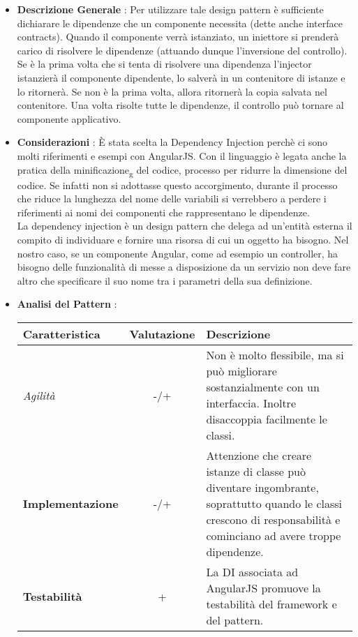 {{{			\begin{itemize}\itemsep1pt
				\item \textbf{Descrizione Generale} : Per utilizzare tale design pattern è sufficiente dichiarare le dipendenze che un componente necessita (dette anche interface contracts). Quando il componente verrà istanziato, un iniettore si prenderà carico di risolvere le dipendenze (attuando dunque l'inversione del controllo). Se è la prima volta che si tenta di risolvere una dipendenza l'injector istanzierà il componente dipendente, lo salverà in un contenitore di istanze e lo ritornerà. Se non è la prima volta, allora ritornerà la copia salvata nel contenitore. Una volta risolte tutte le dipendenze, il controllo può tornare al componente applicativo.
				\item \textbf{Considerazioni} : È stata scelta la Dependency Injection perchè ci sono molti riferimenti e esempi con AngularJS. Con il linguaggio è legata anche la pratica della minificazione\textsubscript{g} del codice, processo per ridurre la dimensione del codice. Se infatti non si adottasse questo accorgimento, durante il processo che riduce la lunghezza del nome delle variabili si verrebbero a perdere i riferimenti ai nomi dei componenti che rappresentano le dipendenze.\\
				La dependency injection è un design pattern che delega ad un’entità esterna il compito di individuare e fornire una risorsa di cui un oggetto ha bisogno. Nel nostro caso, se un componente Angular, come ad esempio un controller, ha bisogno delle funzionalità di messe a disposizione da un servizio non deve fare altro che specificare il suo nome tra i parametri della sua definizione.
				\item \textbf{Analisi del Pattern} :
				\small %
				{\renewcommand\arraystretch{1.2} %
					\begin{tabular}{|l|c|l|}
						\hline
						{\textbf{Caratteristica}}&{\textbf{Valutazione}}&{\textbf{Descrizione}}\\
						\hline
						\textit{Agilità} & -/+ & Non è molto flessibile, ma si può migliorare sostanzialmente con un interfaccia. Inoltre disaccoppia facilmente le classi. \\
						\hline
						\textbf{Implementazione} & -/+ & Attenzione che creare istanze di classe può diventare ingombrante, soprattutto quando le classi crescono di responsabilità e cominciano ad avere troppe dipendenze. \\
						\hline
						\textbf{Testabilità} & + & La DI associata ad AngularJS promuove la testabilità del framework e del pattern. \\

\end{tabular}}
\end{itemize}}}}

